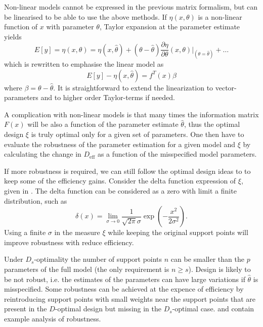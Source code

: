 \documentclass[12pt]{iopart}
\begin{document}
Non-linear models cannot be expressed in the previous matrix formalism, but can be linearised to be able to use the above methods. If $\eta(x, \theta)$ is a non-linear function of $x$ with parameter $\theta$, Taylor expansion at the parameter estimate yields
\begin{equation}
E[y] = \eta(x, \theta) = \eta(x, \hat \theta) + (\theta - \hat \theta) \frac{\partial \eta}{\partial \theta}(x, \theta)|_{(\theta = \hat \theta)} + \ldots
\end{equation}
which is rewritten to emphasise the linear model as
\begin{equation}
E[y] - \eta(x, \hat \theta) = f^T(x) \beta 
\end{equation}
where $\beta = \theta - \hat \theta$. It is straightforward to extend the linearization to vector-parameters and to higher order Taylor-terms if needed.

A complication with non-linear models is that many times the information matrix $F(x)$ will be also a function of the parameter estimate $\hat \theta$, thus the optimal design $\xi$ is truly optimal only for a given set of parameters. One then have to evaluate the robustness of the parameter estimation for a given model and $\xi$ by calculating the change in $D_\mathrm{eff}$ as a function of the misspecified model parameters.

If more robustness is required, we can still follow the optimal design ideas to to keep some of the efficiency gains. Consider the delta function expression of $\xi$, given in . The delta function can be considered as a zero with limit a finite distribution, such as
\begin{equation}
\delta(x) = \lim_{\sigma \rightarrow 0} \frac{1}{\sqrt{2 \pi} \sigma } \exp\left(-\frac{x^2}{2 \sigma^2}\right).
\label{eq:deltafinite}
\end{equation}
Using a finite $\sigma$ in the measure $\xi$ while keeping the original support points will improve robustness with reduce efficiency. 

Under $D_s$-optimality the number of support points $n$ can be smaller than the $p$ parameters of the full model (the only requirement is $n \geq s$). Design is likely to be not robust, i.e. the estimates of the parameters can have large variations if $\hat \theta$ is misspecified. Some robustness can be achieved at the expence of efficiency by reintroducing support points with small weights near the support points that are present in the $D$-optimal design but missing in the $D_s$-optimal case.  and  contain example analysis of robustness.
\end{document}
